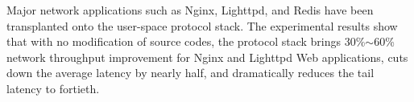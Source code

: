 \begin{eabstract}
Major network applications such as Nginx, Lighttpd, and Redis have been transplanted onto the user-space protocol stack. The experimental results show that with no modification of source codes, the protocol stack brings 30\%$\sim$60\% network throughput improvement for Nginx and Lighttpd Web applications, cuts down the average latency by nearly half, and dramatically reduces the tail latency to fortieth.

\end{eabstract}

